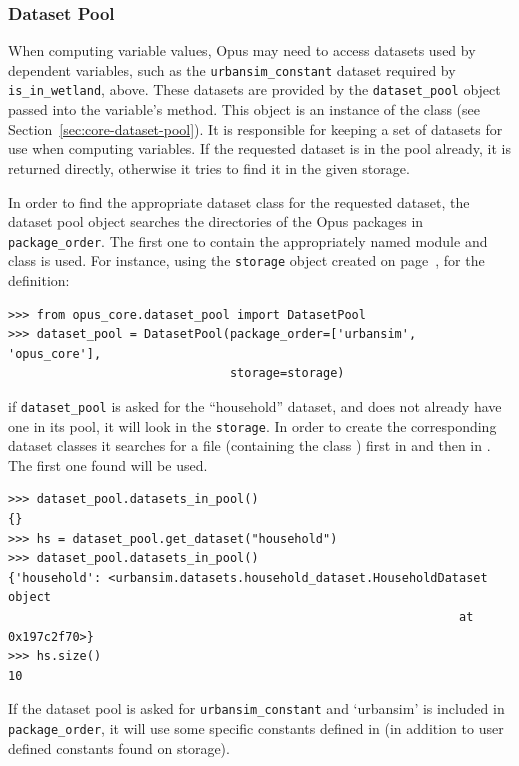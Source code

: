 \subsubsection{Dataset Pool}
%
When computing variable values, Opus may need to access datasets used by
dependent variables, such as the \verb|urbansim_constant| dataset required by
\verb|is_in_wetland|, above.  These datasets are provided by the
\verb|dataset_pool| object passed into the variable's  method.
This object is an instance of the  class (see Section~\ref{sec:core-dataset-pool}).  It is responsible
for keeping a set of datasets for use when computing
variables.  If the requested dataset is in the pool already, it is returned
directly, otherwise it tries to find it in the given storage.

In order to find the appropriate dataset class for the requested dataset, the dataset
pool object searches the  directories of the Opus packages in
\verb|package_order|.  The first one to contain the appropriately named module
and class is used.  For instance, using the \verb|storage| object created on page~\pageref{storagepage},
for the definition:
\begin{verbatim}
>>> from opus_core.dataset_pool import DatasetPool
>>> dataset_pool = DatasetPool(package_order=['urbansim', 'opus_core'],
                               storage=storage)
\end{verbatim}
if \verb|dataset_pool| is asked for the ``household'' dataset, and does not
already have one in its pool, it will look in the \verb|storage|. In order to
create the corresponding dataset classes
it searches for a file
 (containing the class ) first in  and then in
. The first one found will be used.
\begin{verbatim}
>>> dataset_pool.datasets_in_pool()
{}
>>> hs = dataset_pool.get_dataset("household")
>>> dataset_pool.datasets_in_pool()
{'household': <urbansim.datasets.household_dataset.HouseholdDataset object
                                                               at 0x197c2f70>}
>>> hs.size()
10
\end{verbatim}
If the dataset pool is asked for \verb|urbansim_constant| and `urbansim' is included in \verb|package_order|,
it will use some  specific constants defined in  (in addition to
user defined constants found on storage).


